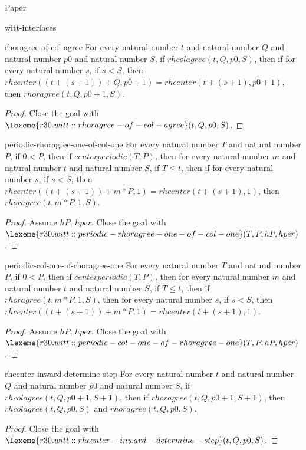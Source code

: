 \begin{lexlean}{Paper}
\begin{section}{witt-interfaces}
  \begin{theorem}{rhoragree-of-col-agree}
  For every natural number \(t\) and natural number \(Q\) and natural number \(p0\) and natural number \(S\), if \(rhcolagree(t, Q, p0, S)\), then if for every natural number \(s\), if \(s < S\), then \(rhcenter((t + (s + 1)) + Q, p0 + 1) = rhcenter(t + (s + 1), p0 + 1)\), then \(rhoragree(t, Q, p0 + 1, S)\).
  \begin{proof}
  Close the goal with \(\lexeme{r30.witt::rhoragree-of-col-agree}(t, Q, p0, S)\).
  \end{proof}
  \end{theorem}

  \begin{theorem}{periodic-rhoragree-one-of-col-one}
  For every natural number \(T\) and natural number \(P\), if \(0 < P\), then if \(centerperiodic(T, P)\), then for every natural number \(m\) and natural number \(t\) and natural number \(S\), if \(T ≤ t\), then if for every natural number \(s\), if \(s < S\), then \(rhcenter((t + (s + 1)) + m * P, 1) = rhcenter(t + (s + 1), 1)\), then \(rhoragree(t, m * P, 1, S)\).
  \begin{proof}
  Assume \(hP\), \(hper\).
  Close the goal with \(\lexeme{r30.witt::periodic-rhoragree-one-of-col-one}(T, P, hP, hper)\).
  \end{proof}
  \end{theorem}

  \begin{theorem}{periodic-col-one-of-rhoragree-one}
  For every natural number \(T\) and natural number \(P\), if \(0 < P\), then if \(centerperiodic(T, P)\), then for every natural number \(m\) and natural number \(t\) and natural number \(S\), if \(T ≤ t\), then if \(rhoragree(t, m * P, 1, S)\), then for every natural number \(s\), if \(s < S\), then \(rhcenter((t + (s + 1)) + m * P, 1) = rhcenter(t + (s + 1), 1)\).
  \begin{proof}
  Assume \(hP\), \(hper\).
  Close the goal with \(\lexeme{r30.witt::periodic-col-one-of-rhoragree-one}(T, P, hP, hper)\).
  \end{proof}
  \end{theorem}

  \begin{theorem}{rhcenter-inward-determine-step}
  For every natural number \(t\) and natural number \(Q\) and natural number \(p0\) and natural number \(S\), if \(rhcolagree(t, Q, p0 + 1, S + 1)\), then if \(rhoragree(t, Q, p0 + 1, S + 1)\), then \(rhcolagree(t, Q, p0, S)\) and \(rhoragree(t, Q, p0, S)\).
  \begin{proof}
  Close the goal with \(\lexeme{r30.witt::rhcenter-inward-determine-step}(t, Q, p0, S)\).
  \end{proof}
  \end{theorem}


\end{section}
\end{lexlean}
